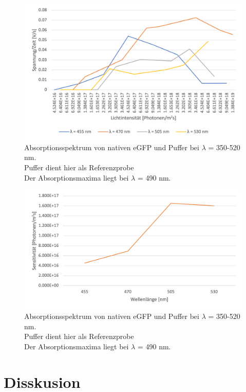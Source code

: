 \documentclass[10pt,a4paper]{article}
\begin{document}
		\begin{figure}[H]
		\centering
		\includegraphics[scale=1]{Picture 5.png}
		\caption{Absorptionsspektrum von nativen eGFP und Puffer bei  $\lambda$ = 350-520 nm. \\
			Puffer dient hier als Referenzprobe\\
			Der Absorptionsmaxima liegt bei $\lambda$ = 490 nm.}
		\label{fig:Lichtitration}
	\end{figure}
	
		\begin{figure}[H]
		\centering
		\includegraphics[scale=1]{Picture 6.png}
		\caption{Absorptionsspektrum von nativen eGFP und Puffer bei  $\lambda$ = 350-520 nm. \\
			Puffer dient hier als Referenzprobe\\
			Der Absorptionsmaxima liegt bei $\lambda$ = 490 nm.}
		\label{fig: Aktionsspektrum}
	\end{figure}
	
	\section{Disskusion}
	
	
\end{document}

